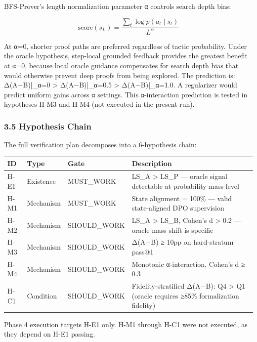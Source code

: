 BFS-Prover's length normalization parameter α controls search depth bias:

$$\text{score}(s_L) = \frac{\sum_t \log p(a_t \mid s_t)}{L^\alpha}$$

At α=0, shorter proof paths are preferred regardless of tactic probability. Under the oracle hypothesis, step-local grounded feedback provides the greatest benefit at α=0, because local oracle guidance compensates for search depth bias that would otherwise prevent deep proofs from being explored. The prediction is: Δ(A−B)|_{α=0} > Δ(A−B)|_{α=0.5} > Δ(A−B)|_{α=1.0}. A regularizer would predict uniform gains across α settings. This α-interaction prediction is tested in hypotheses H-M3 and H-M4 (not executed in the present run).

\subsubsection{3.5 Hypothesis Chain}

The full verification plan decomposes into a 6-hypothesis chain:

\begin{table}[htbp]
\centering
\begin{tabular}{llll}
\toprule
ID & Type & Gate & Description \\
\midrule
H-E1 & Existence & MUST_WORK & LS_A > LS_P — oracle signal detectable at probability mass level \\
H-M1 & Mechanism & MUST_WORK & State alignment = 100\% — valid state-aligned DPO supervision \\
H-M2 & Mechanism & SHOULD_WORK & LS_A > LS_B, Cohen's d > 0.2 — oracle mass shift is specific \\
H-M3 & Mechanism & SHOULD_WORK & Δ(A−B) ≥ 10pp on hard-stratum pass@1 \\
H-M4 & Mechanism & SHOULD_WORK & Monotonic α-interaction, Cohen's d ≥ 0.3 \\
H-C1 & Condition & SHOULD_WORK & Fidelity-stratified Δ(A−B): Q4 > Q1 (oracle requires ≥85\% formalization fidelity) \\
\bottomrule
\end{tabular}
\end{table}

Phase 4 execution targets H-E1 only. H-M1 through H-C1 were not executed, as they depend on H-E1 passing.
